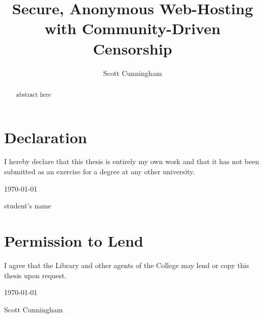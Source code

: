 
\title{Secure, Anonymous Web-Hosting with Community-Driven Censorship}
\author{Scott Cunningham}

\maketitle

\chapter*{Declaration}

I hereby declare that this thesis is entirely my own work and that it
has not been submitted as an exercise for a degree at any other
university.

\begin{center}
    \vspace*{2in}

    \underline{\hspace*{3in}} \today

    student's name
\end{center}

\chapter*{Permission to Lend}

I agree that the Library and other agents of
the College may lend or copy this thesis upon request.

\begin{center}
    \vspace*{2in}

    \underline{\hspace*{3in}} \today

    Scott Cunningham


\end{center}


\begin{abstract}

abstract here

\end{abstract}

